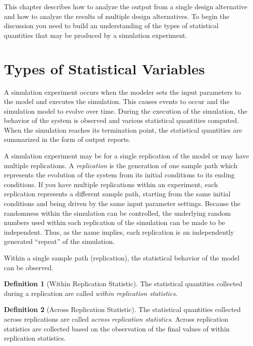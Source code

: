 \documentclass[
]{book}
\theoremstyle{definition}
\newtheorem{definition}{Definition}[chapter]
\theoremstyle{definition}
\theoremstyle{definition}
\theoremstyle{definition}
\theoremstyle{remark}
\begin{document}
This chapter describes how to analyze the output from a single design
alternative and how to analyze the results of multiple design
alternatives. To begin the discussion you need to build an understanding
of the types of statistical quantities that may be produced by a
simulation experiment.

\hypertarget{simoa:datatypes}{%
\section{Types of Statistical Variables}\label{simoa:datatypes}}

A simulation experiment occurs when the modeler sets the input
parameters to the model and executes the simulation. This causes events
to occur and the simulation model to evolve over time. During the
execution of the simulation, the behavior of the system is observed and
various statistical quantities computed. When the simulation reaches its
termination point, the statistical quantities are summarized in the form
of output reports.

A simulation experiment may be for a single replication of the model or
may have multiple replications. A \emph{replication} is the generation of one
sample path which represents the evolution of the system from its
initial conditions to its ending conditions. If you have multiple
replications within an experiment, each replication represents a
different sample path, starting from the same initial conditions and
being driven by the same input parameter settings. Because the
randomness within the simulation can be controlled, the underlying
random numbers used within each replication of the simulation can be
made to be independent. Thus, as the name implies, each replication is
an independently generated ``repeat'' of the simulation.

Within a single sample path (replication), the statistical behavior of
the model can be observed.

\begin{definition}[Within Replication Statistic]
\protect\hypertarget{def:WRS}{}{\label{def:WRS} {} }The statistical quantities collected during a replication are called \emph{within replication
statistics}.
\end{definition}

\begin{definition}[Across Replication Statistic]
\protect\hypertarget{def:ARS}{}{\label{def:ARS} {} }The statistical quantities
collected across replications are called \emph{across replication
statistics}. Across replication statistics are collected based on the
observation of the final values of within replication statistics.
\end{definition}
\end{document}
